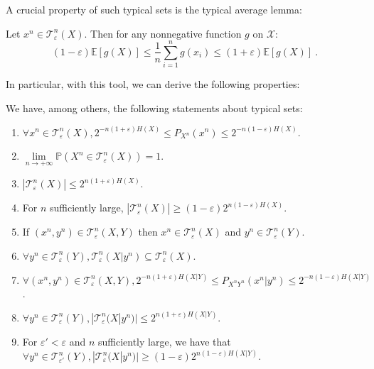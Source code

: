       A crucial property of such typical sets is the typical average lemma:
      \begin{lemma}
        Let $x^n \in \mathcal{T}^n_{\varepsilon}(X)$. Then for any nonnegative function $g$ on $\mathcal{X}$:
        \[ (1-\varepsilon)\mathbb{E}[g(X)] \leq \frac{1}{n}\sum_{i=1}^ng(x_i) \leq (1+\varepsilon)\mathbb{E}[g(X)] \ . \]
      \end{lemma}
      
      In particular, with this tool, we can derive the following properties:      
      \begin{proposition}
        We have, among others, the following statements about typical sets:
        \begin{enumerate}
        \item $\forall x^n \in \mathcal{T}^n_{\varepsilon}(X), 2^{-n(1+\varepsilon)H(X)} \leq P_{X^n}(x^n) \leq 2^{-n(1-\varepsilon)H(X)}$.
        \item $\underset{n \rightarrow +\infty}{\lim} \mathbb{P}\left(X^n \in \mathcal{T}^n_{\varepsilon}(X) \right) = 1$.
        \item $|\mathcal{T}^n_{\varepsilon}(X)| \leq 2^{n(1+\varepsilon)H(X)}$.
        \item For $n$ sufficiently large, $|\mathcal{T}^n_{\varepsilon}(X)| \geq (1-\varepsilon)2^{n(1-\varepsilon)H(X)}$.
        \item If $(x^n,y^n) \in \mathcal{T}^n_{\varepsilon}(X,Y)$ then $x^n \in \mathcal{T}^n_{\varepsilon}(X)$ and $y^n \in \mathcal{T}^n_{\varepsilon}(Y)$.
        \item $\forall y^n \in \mathcal{T}^n_{\varepsilon}(Y), \mathcal{T}^n_{\varepsilon}(X|y^n) \subseteq \mathcal{T}^n_{\varepsilon}(X)$.
        \item $\forall (x^n,y^n) \in \mathcal{T}^n_{\varepsilon}(X,Y), 2^{-n(1+\varepsilon)H(X|Y)} \leq P_{X^nY^n}(x^n|y^n) \leq 2^{-n(1-\varepsilon)H(X|Y)}$.
        \item $\forall y^n \in \mathcal{T}^n_{\varepsilon}(Y), |\mathcal{T}^n_{\varepsilon}(X|y^n)| \leq 2^{n(1+\varepsilon)H(X|Y)}$.
        \item For $\varepsilon' < \varepsilon$ and $n$ sufficiently large, we have that $\forall y^n \in \mathcal{T}^n_{\varepsilon'}(Y), |\mathcal{T}^n_{\varepsilon}(X|y^n)| \geq (1-\varepsilon)2^{n(1-\varepsilon)H(X|Y)}$.
        \end{enumerate}
      \end{proposition}
